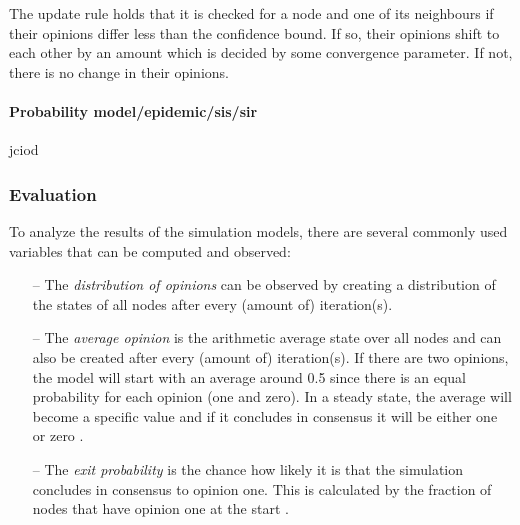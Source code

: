 The update rule holds that it is checked for a node and one of its neighbours if their opinions differ less than the confidence bound. If so, their opinions shift to each other by an amount which is decided by some convergence parameter. If not, there is no change in their opinions. \cite{menczer_fortunato_davis_2020}
\paragraph{Probability model/epidemic/sis/sir}
jciod

\subsubsection{Evaluation\nopunct}\hfill \break
To analyze the results of the simulation models, there are several commonly used variables that can be computed and observed:
\begin{itemize}
    \item[--] The \textit{distribution of opinions} can be observed by creating a distribution of the states of all nodes after every (amount of) iteration(s).
    \item[--] The \textit{average opinion} is the arithmetic average state over all nodes and can also be created after every (amount of) iteration(s). If there are two opinions, the model will start with an average around 0.5 since there is an equal probability for each opinion (one and zero). In a steady state, the average will become a specific value and if it concludes in consensus it will be either one or zero \cite{menczer_fortunato_davis_2020}.
    \item[--] The \textit{exit probability} is the chance how likely it is that the simulation concludes in consensus to opinion one. This is calculated by the fraction of nodes that have opinion one at the start \cite{menczer_fortunato_davis_2020}.
\end{itemize}